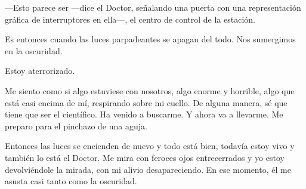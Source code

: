 ---Esto parece ser ---dice el Doctor, señalando una puerta con una
representación gráfica de interruptores en ella---, el centro de control
de la estación.

Es entonces cuando las luces parpadeantes se apagan del todo. Nos
sumergimos en la oscuridad.

Estoy aterrorizado.

Me siento como si algo estuviese con nosotros, algo enorme y horrible,
algo que está casi encima de mí, respirando sobre mi cuello. De alguna
manera, sé que tiene que ser el científico. Ha venido a buscarme. Y
ahora va a llevarme. Me preparo para el pinchazo de una aguja.

Entonces las luces se encienden de nuevo y todo está bien, todavía estoy
vivo y también lo está el Doctor. Me mira con feroces ojos entrecerrados
y yo estoy devolviéndole la mirada, con mi alivio desapareciendo. En ese
momento, él me asusta casi tanto como la oscuridad.